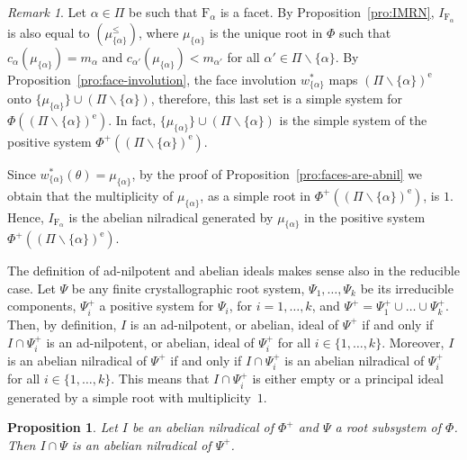 \documentclass[10pt]{amsart}
\newtheorem{pro}[thm]{Proposition}
\theoremstyle{definition}
\theoremstyle{remark}
\newtheorem{rem}[thm]{Remark}
\newcommand\smeno{\smallsetminus}
\newcommand\al{\alpha}
\newcommand\erm{{\mathrm{e}}}
\renewcommand{\leq}{\leqslant}
\begin{document}
\begin{rem}\label{rem:abnil}
Let $\al\in \Pi$ be such that $\mathrm F_\al$ is a facet. 
By Proposition~\ref{pro:IMRN}, $I_{\mathrm F_\al}$ is also equal to $(\mu_{\{\al\}}^\leq)$, where  $\mu_{\{\al\}}$  is the unique root in $\Phi$ such that $c_\al(\mu_{\{\al\}})=m_\al$ and $c_{\al'}(\mu_{\{\al\}})<m_{\al'}$ for all $\al'\in\Pi\smeno\{\al\}$.  
By Proposition~\ref{pro:face-involution}, the face involution $w_{\{\al\}}^*$ maps $(\Pi\smeno\{\al\})^\erm$ onto $\{\mu_{\{\al\}}\}\cup (\Pi\smeno\{\al\})$, therefore, this last set is a simple system for $\Phi((\Pi\smeno\{\al\})^\erm)$. 
In fact,  $\{\mu_{\{\al\}}\}\cup (\Pi\smeno\{\al\})$ is the simple system of the positive system $\Phi^+((\Pi\smeno\{\al\})^\erm)$.

\par 
Since $w_{\{\al\}}^*(\theta)=\mu_{\{\al\}}$, by the proof of Proposition~\ref{pro:faces-are-abnil} we obtain that the multiplicity of $\mu_{\{\al\}}$, as a simple root in $\Phi^+((\Pi\smeno\{\al\})^\erm)$, is $1$. 
Hence, $I_{\mathrm F_\al}$ is the abelian nilradical generated by $\mu_{\{\al\}}$ in the  positive system $\Phi^+((\Pi\smeno\{\al\})^\erm)$.
\end{rem}

The definition of ad-nilpotent and abelian ideals makes sense also in the reducible case. 
Let $\Psi$ be any finite crystallographic root system, $\Psi_1, \dots, \Psi_k$ be its irreducible components, $\Psi_i^+$ a positive system for $\Psi_i$, for $i=1, \dots, k$, and $\Psi^+=\Psi_1^+\cup\dots\cup \Psi_k^+$. 
Then, by definition, $I$ is an ad-nilpotent, or abelian, ideal of $\Psi^+$ if and only if $I\cap \Psi_i^+$ is an ad-nilpotent, or abelian, ideal of $\Psi_i^+$ for all $i\in\{1, \dots, k\}$. 
Moreover,  $I$ is an abelian nilradical of $\Psi^+$ if and only if $I\cap \Psi_i^+$ is an abelian nilradical of $\Psi_i^+$ for all $i\in\{1, \dots, k\}$. This means that $I\cap \Psi_i^+$ is either empty  or a principal ideal generated by a simple root with multiplicity~$1$.

\begin{pro}\label{pro:induzione}
Let $I$ be an abelian nilradical of $\Phi^+$ and $\Psi$ a root subsystem of $\Phi$.
Then $I\cap \Psi$ is an abelian nilradical  of $\Psi^+$.
\end{pro}
\end{document}
